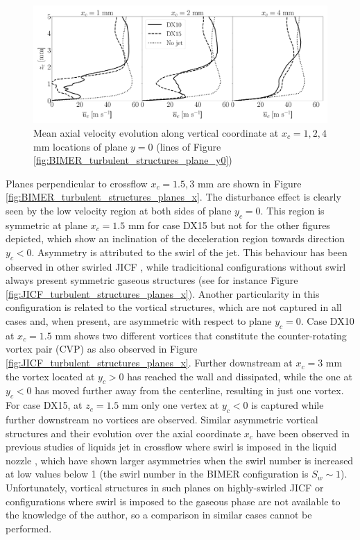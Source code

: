 \begin{figure}[ht]
\centering
   \includegraphics[scale=0.24]{./part3_applications/figures_ch8_resolved/turbulent_structures/lines_y0_along_z_ux_mean}
\vspace{-0.15in}
\caption{Mean axial velocity evolution along vertical coordinate at $x_c = 1, 2, 4$ mm locations of plane $y = 0$ (lines of Figure \ref{fig:BIMER_turbulent_structures_plane_y0})}
\label{fig:BIMER_sps_lines_y0_along_z_ux_mean}
\end{figure}


Planes perpendicular to crossflow $x_c = 1.5, 3$ mm are shown in Figure \ref{fig:BIMER_turbulent_structures_planes_x}. The disturbance effect is clearly seen by the low velocity region at both sides of plane $y_c = 0$. This region is symmetric at plane $x_c = 1.5$ mm for case DX15 but not for the other figures depicted, which show an inclination of the deceleration region towards direction $y_c < 0$. Asymmetry is attributed to the swirl of the jet.  This behaviour has been observed in other swirled JICF , while tradicitional configurations without swirl always present symmetric gaseous structures (see for instance Figure \ref{fig:JICF_turbulent_structures_planes_x}). Another particularity in this configuration is related to the vortical structures, which are not captured in all cases and, when present, are asymmetric with respect to plane $y_c = 0$. Case DX10 at $x_c = 1.5$ mm shows two different vortices that constitute the counter-rotating vortex pair (CVP) as also observed in Figure \ref{fig:JICF_turbulent_structures_planes_x}. Further downstream at $x_c = 3$ mm the vortex located at $y_c > 0$ has reached the wall and dissipated, while the one at $y_c < 0$ has moved further away from the centerline, resulting in just one vortex. For case DX15, at $z_c = 1.5$ mm only one vertex at $y_c < 0$ is captured while further downstream no vortices are observed. Similar asymmetric vortical structures and their evolution over the axial coordinate $x_c$ have been observed in previous studies of liquids jet in crossflow where swirl is imposed in the liquid nozzle , which have shown larger asymmetries when the swirl number is increased at low values below 1 (the swirl number in the BIMER configuration is $S_w \sim 1$). Unfortunately, vortical structures in such planes on highly-swirled JICF or configurations where swirl is imposed to the gaseous phase are not available to the knowledge of the author, so a comparison in similar cases cannot be performed.



